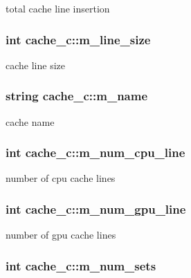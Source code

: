 total cache line insertion \hypertarget{classcache__c_ae4a82fe5d53c5b2b6382295628852888}{
\subsubsection[{m\_\-line\_\-size}]{\setlength{\rightskip}{0pt plus 5cm}int {\bf cache\_\-c::m\_\-line\_\-size}}}
\label{classcache__c_ae4a82fe5d53c5b2b6382295628852888}
cache line size \hypertarget{classcache__c_a6feda51818d2216832b855cd4a36d400}{
\subsubsection[{m\_\-name}]{\setlength{\rightskip}{0pt plus 5cm}string {\bf cache\_\-c::m\_\-name}}}
\label{classcache__c_a6feda51818d2216832b855cd4a36d400}
cache name \hypertarget{classcache__c_a12bfa9ef1a83b1e4d52c603191580c5d}{
\subsubsection[{m\_\-num\_\-cpu\_\-line}]{\setlength{\rightskip}{0pt plus 5cm}int {\bf cache\_\-c::m\_\-num\_\-cpu\_\-line}}}
\label{classcache__c_a12bfa9ef1a83b1e4d52c603191580c5d}
number of cpu cache lines \hypertarget{classcache__c_ac46d9f6ed3c0e253796e8584c34aceb0}{
\subsubsection[{m\_\-num\_\-gpu\_\-line}]{\setlength{\rightskip}{0pt plus 5cm}int {\bf cache\_\-c::m\_\-num\_\-gpu\_\-line}}}
\label{classcache__c_ac46d9f6ed3c0e253796e8584c34aceb0}
number of gpu cache lines \hypertarget{classcache__c_a1e7c693df55654e3c37aa5e8fcf80272}{
\subsubsection[{m\_\-num\_\-sets}]{\setlength{\rightskip}{0pt plus 5cm}int {\bf cache\_\-c::m\_\-num\_\-sets}}}
